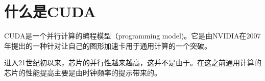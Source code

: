 
\chapter{什么是CUDA}

CUDA是一个并行计算的编程模型（programming model)。它是由NVIDIA在2007年提出的一种针对让自己的图形加速卡用于通用计算的一个突破。

进入21世纪初以来，芯片的并行性越来越高，这并不是由于。在这之前通用计算的芯片的性能提高主要是由时钟频率的提示带来的。